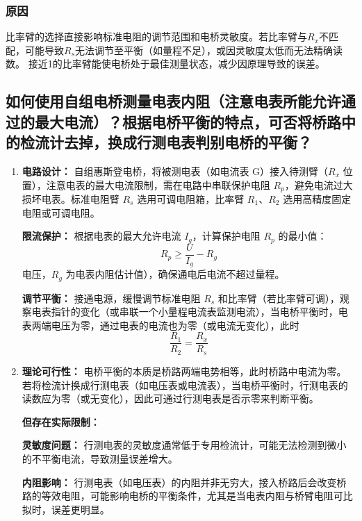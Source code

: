 \documentclass{../../templates/Report}%
\begin{document}
\begin{fullreportonly}
\subsubsection{原因}
比率臂的选择直接影响标准电阻的调节范围和电桥灵敏度。若比率臂与$R_x$不匹配，可能导致$R_s$无法调节至平衡（如量程不足），或因灵敏度太低而无法精确读数。
接近1的比率臂能使电桥处于最佳测量状态，减少因原理导致的误差。
\subsection{如何使用自组电桥测量电表内阻（注意电表所能允许通过的最大电流）？根据电桥平衡的特点，可否将桥路中的检流计去掉，换成行测电表判别电桥的平衡？}

\begin{enumerate}
    \item \textbf{电路设计：} 自组惠斯登电桥，将被测电表（如电流表 G）接入待测臂（$R_x$ 位置），注意电表的最大电流限制，需在电路中串联保护电阻 $R_p$，避免电流过大损坏电表。标准电阻臂 $R_s$ 选用可调电阻箱，比率臂 $R_1$、$R_2$ 选用高精度固定电阻或可调电阻。

    \textbf{限流保护：} 根据电表的最大允许电流 $I_g$，计算保护电阻 $R_p$ 的最小值：
    \[
        R_p \ge \frac{U}{I_g} - R_g
    \]
    电压，$R_g$ 为电表内阻估计值），确保通电后电流不超过量程。

    \textbf{调节平衡：} 接通电源，缓慢调节标准电阻 $R_s$ 和比率臂（若比率臂可调），观察电表指针的变化（或串联一个小量程电流表监测电流），当电桥平衡时，电表两端电压为零，通过电表的电流也为零（或电流无变化），此时
    \[
        \frac{R_1}{R_2} = \frac{R_x}{R_s}
    \]

    \item \textbf{理论可行性：} 电桥平衡的本质是桥路两端电势相等，此时桥路中电流为零。若将检流计换成行测电表（如电压表或电流表），当电桥平衡时，行测电表的读数应为零（或无变化），因此可通过行测电表是否示零来判断平衡。

    \textbf{但存在实际限制：}

    \textbf{灵敏度问题：} 行测电表的灵敏度通常低于专用检流计，可能无法检测到微小的不平衡电流，导致测量误差增大。

    \textbf{内阻影响：} 行测电表（如电压表）的内阻并非无穷大，接入桥路后会改变桥路的等效电阻，可能影响电桥的平衡条件，尤其是当电表内阻与桥臂电阻可比拟时，误差更明显。
\end{enumerate}
\end{fullreportonly}
\insertnotes
\end{document}

